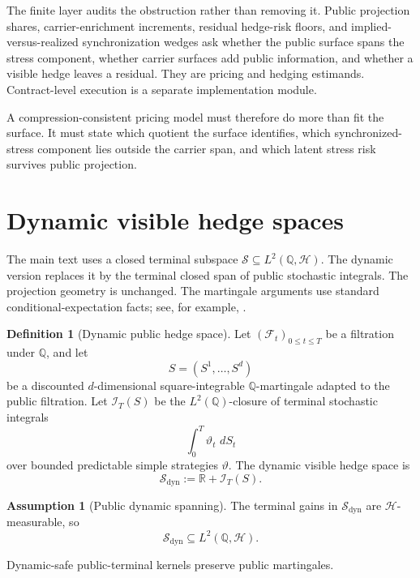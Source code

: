 \documentclass[11pt,a4paper]{amsart}
\theoremstyle{plain}
\theoremstyle{definition}
\newtheorem{definition}[theorem]{Definition}
\newtheorem{assumption}[theorem]{Assumption}
\theoremstyle{remark}
\newcommand{\R}{\mathbb{R}}
\newcommand{\QQ}{\mathbb{Q}}
\newcommand{\cF}{\mathcal{F}}
\newcommand{\cH}{\mathcal{H}}
\newcommand{\cI}{\mathcal{I}}
\newcommand{\cS}{\mathcal{S}}
\newcommand{\dd}{\,d}
\begin{document}
The finite layer audits the obstruction rather than removing it.  Public projection shares,
carrier-enrichment increments, residual hedge-risk floors, and implied-versus-realized
synchronization wedges ask whether the public surface spans the stress component, whether carrier
surfaces add public information, and whether a visible hedge leaves a residual.  They are pricing
and hedging estimands.  Contract-level execution is a separate implementation module.

A compression-consistent pricing model must therefore do more than fit the surface.  It must state
which quotient the surface identifies, which synchronized-stress component lies outside the carrier
span, and which latent stress risk survives public projection.

\appendix

\section{Dynamic visible hedge spaces}\label{app:dynamic}

The main text uses a closed terminal subspace \(\cS\subseteq L^2(\QQ,\cH)\).  The dynamic version
replaces it by the terminal closed span of public stochastic integrals.  The projection geometry is
unchanged.  The martingale arguments use standard conditional-expectation facts; see, for example,
\cite{williams1991}.

\begin{definition}[Dynamic public hedge space]\label{def:dynamic-hedge-space}
Let \((\cF_t)_{0\le t\le T}\) be a filtration under \(\QQ\), and let
\[
        S=(S^1,\ldots,S^d)
\]
be a discounted \(d\)-dimensional square-integrable \(\QQ\)-martingale adapted to the public
filtration.  Let \(\cI_T(S)\) be the \(L^2(\QQ)\)-closure of terminal stochastic integrals
\[
        \int_0^T \vartheta_t\,\dd S_t
\]
over bounded predictable simple strategies \(\vartheta\).  The dynamic visible hedge space is
\[
        \cS_{\mathrm{dyn}}
        :=
        \R+\cI_T(S).
\]
\end{definition}

\begin{assumption}[Public dynamic spanning]\label{ass:dynamic-public}
The terminal gains in \(\cS_{\mathrm{dyn}}\) are \(\cH\)-measurable, so
\[
        \cS_{\mathrm{dyn}}\subseteq L^2(\QQ,\cH).
\]
\end{assumption}

Dynamic-safe public-terminal kernels preserve public martingales.
\end{document}
